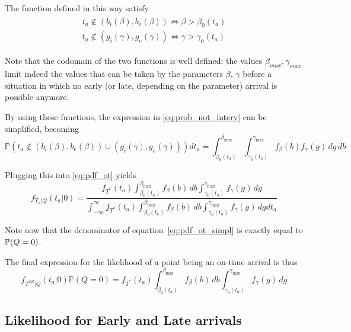 The function defined in this way satisfy
\begin{align}
  \label{eq:threshold_def}
  \begin{split}
     t_a \not\in (b_i(\beta), b_e(\beta)) \iff \beta > \beta_0(t_a) \\
    t_a \not\in (g_i(\gamma), g_e(\gamma)) \iff \gamma > \gamma_0(t_a)
  \end{split}
\end{align}

Note that the codomain of the two functions is well defined:
the values \(\beta_{max}, \gamma_{max}\) limit indeed the values that can be taken by the parameters \(\beta\), \(\gamma\) before a situation in which no early
(or late, depending on the parameter)
arrival is possible anymore.

By using these functions, the expression in \eqref{eq:prob_not_interv} can be simplified, becoming
\begin{equation}
  \label{eq:prob_not_interv_simpl}
  \mathbb{P}( t_a \not\in (b_i(\beta), b_e(\beta)) \cup (g_i(\gamma), g_e(\gamma)))dt_a = \int_{\beta_0(t_a)}^{\beta_{\text{max}}}\int_{\gamma_0(t_a)}^{\gamma_{\text{max}}}f_\beta(b)f_\gamma(g)\, dg\, db
\end{equation}

Plugging this into \eqref{eq:pdf_ot} yields
\begin{equation}
  \label{eq:pdf_ot_simpl}
  f_{T_a | Q}(t_a | 0) = \frac{f_{T^*}(t_a)\int_{\beta_0(t_a)}^{\beta_\text{max}}f_\beta(b)\, db\int_{\gamma_0(t_a)}^{\gamma_\text{max}}f_\gamma(g)\, dg}{\int_{-\infty}^\infty f_{T^*}(t_a)\int_{\beta_0(t_a)}^{\beta_\text{max}}f_\beta(b)\, db\int_{\gamma_0(t_a)}^{\gamma_\text{max}}f_\gamma(g)\, dgdt_a}
\end{equation}

Note now that the denominator of equation~\eqref{eq:pdf_ot_simpl} is exactly equal to \(\mathbb{P}(Q = 0)\).

The final expression for the likelihood of a point being an on-time arrival is thus
\begin{equation}
  \label{eq:lik_ot}
  f_{T^{opt} | Q}(t_a | 0)\mathbb{P}(Q = 0) = f_{T^*}(t_a)\int_{\beta_0(t_a)}^{\beta_\text{max}}f_\beta(b)\, db\int_{\gamma_0(t_a)}^{\gamma_\text{max}}f_\gamma(g)\, dg
\end{equation}

\subsection{Likelihood for Early and Late arrivals}
\label{sec:lik_early_late}

